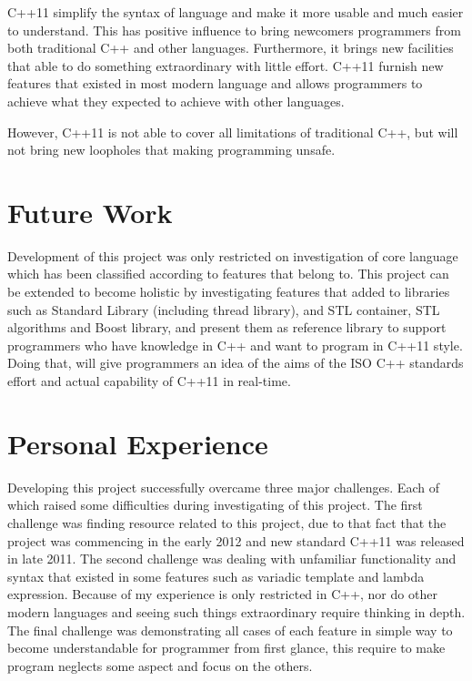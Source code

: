 \documentclass[11pt]{report}
\begin{document}
C++11 simplify the syntax of language and make it more usable and much easier to understand. This has positive influence to bring newcomers programmers from both traditional C++ and other languages. Furthermore, it brings new facilities that able to do something extraordinary with little effort.  C++11 furnish new features that existed in most modern language and allows programmers to achieve what they expected to achieve with other languages.

However, C++11 is not able to cover all limitations of traditional C++, but will not bring new loopholes that making programming unsafe.

\section{Future Work}
\label{sec: future work}
Development of this project was only restricted on investigation of core language which has been classified according to features that belong to. This project can be extended to become holistic by investigating features that added to libraries such as Standard Library (including thread library), and STL container, STL algorithms and Boost library, and present them as reference library to support programmers who have knowledge in C++ and want to program in  C++11 style. Doing that, will give programmers an idea of the aims of the ISO C++ standards effort and actual capability of C++11 in real-time.

\section{Personal Experience}
\label{sec: personal experience}
Developing this project successfully overcame three major challenges.  Each of which raised some difficulties during investigating of this project.  The first challenge was finding resource related to this project, due to that fact that the project was commencing in the early  2012 and new standard C++11 was released in late  2011. The second challenge was dealing with unfamiliar functionality and syntax that existed in some features such as variadic template and lambda expression. Because of my experience is only restricted in C++, nor do other modern languages and seeing such things extraordinary require thinking in depth. The final challenge was demonstrating all cases of each feature in simple way to become understandable for programmer from first glance, this require to make program neglects some aspect and focus on the others.
\end{document}
